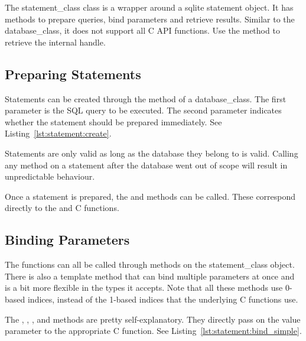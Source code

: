 The \gls{statement_class} class is a wrapper around a \gls{sqlite} statement object. It has methods to prepare queries, bind parameters and retrieve results. Similar to the \gls{database_class}, it does not support all C API functions. Use the  method to retrieve the internal handle.


\subsection{Preparing Statements}
\label{section:statement:create}

Statements can be created through the  method of a \gls{database_class}. The first parameter is the SQL query to be executed. The second parameter indicates whether the statement should be prepared immediately. See Listing~\ref{lst:statement:create}.



Statements are only valid as long as the database they belong to is valid. Calling any method on a statement after the database went out of scope will result in unpredictable behaviour.

Once a statement is prepared, the  and  methods can be called. These correspond directly to the  and  C functions.

\subsection{Binding Parameters}
\label{section:statement:bind}

The  functions can all be called through methods on the \gls{statement_class} object. There is also a template method that can bind multiple parameters at once and is a bit more flexible in the types it accepts. Note that all these methods use 0-based indices, instead of the 1-based indices that the underlying C functions use.

The , , ,  and  methods are pretty self-explanatory. They directly pass on the value parameter to the appropriate C function. See Listing~\ref{lst:statement:bind_simple}.



